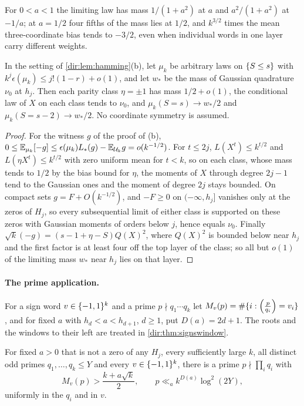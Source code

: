For $0<a<1$ the limiting law has mass $1/(1+a^2)$ at $a$ and $a^2/(1+a^2)$ at $-1/a$; at $a=1/2$
four fifths of the mass lies at $1/2$, and $k^{3/2}$ times the mean three-coordinate bias tends to
$-3/2$, even when individual words in one layer carry different weights.

\begin{proposition}\label{dir:prop:hammingrigidroot}
In the setting of \cref{dir:lem:hamming}(b), let $\mu_k$ be arbitrary laws on $\{S\le s\}$ with
$k^j\epsilon(\mu_k)\le j!(1-r)+o(1)$, and let $w_*$ be the mass of Gaussian quadrature $\nu_0$ at $h_j$.
Then each parity class $\eta=\pm1$ has mass $1/2+o(1)$, the conditional law of $X$ on each class tends to
$\nu_0$, and $\mu_k(S=s)\to w_*/2$ and $\mu_k(S=s-2)\to w_*/2$. No coordinate symmetry is assumed.
\end{proposition}

\begin{proof}
For the witness $g$ of the proof of (b), $0\le\mathbb{E}_{\mu_k}[-g]\le\epsilon(\mu_k)L_*(g)-\mathbb{E}_{\mathcal U_k}g=o(k^{-1/2})$.
For $t\le2j$, $L(X^t)\le k^{t/2}$ and $L(\eta X^t)\le k^{t/2}$ with zero uniform mean for $t<k$, so on
each class, whose mass tends to $1/2$ by the bias bound for $\eta$, the moments of $X$ through degree
$2j-1$ tend to the Gaussian ones and the moment of degree $2j$ stays bounded. On compact sets $g=F+O(k^{-1/2})$,
and $-F\ge0$ on $(-\infty,h_j]$ vanishes only at the zeros of $H_j$, so every subsequential limit of
either class is supported on these zeros with Gaussian moments of orders below $j$, hence equals
$\nu_0$. Finally $\sqrt k(-g)=(s-1+\eta-S)Q(X)^2$, where $Q(X)^2$ is bounded below near $h_j$ and the
first factor is at least four off the top layer of the class; so all but $o(1)$ of the limiting mass
$w_*$ near $h_j$ lies on that layer.
\end{proof}

\paragraph{The prime application.}
For a sign word $v\in\{-1,1\}^k$ and a prime $p\nmid q_1\cdots q_k$ let
$M_v(p)=\#\{i:\Bigl(\frac{p}{q_i}\Bigr)=v_i\}$, and for fixed $a$ with $h_d<a<h_{d+1}$, $d\ge1$, put
$D(a)=2d+1$. The roots and the windows to their left are treated in \cref{dir:thm:signswindow}.

\begin{theorem}\label{dir:thm:signs}
For fixed $a>0$ that is not a zero of any $H_j$, every sufficiently large $k$, all distinct odd primes $q_1,\dots,q_k\le Y$ and
every $v\in\{-1,1\}^k$, there is a prime $p\nmid\prod_iq_i$ with
\[
 M_v(p)>\frac{k+a\sqrt k}2,\qquad p\ll_ak^{D(a)}\log^2(2Y),
\]
uniformly in the $q_i$ and in $v$.
\end{theorem}


